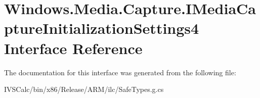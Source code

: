\hypertarget{interface_windows_1_1_media_1_1_capture_1_1_i_media_capture_initialization_settings4}{}\section{Windows.\+Media.\+Capture.\+I\+Media\+Capture\+Initialization\+Settings4 Interface Reference}
\label{interface_windows_1_1_media_1_1_capture_1_1_i_media_capture_initialization_settings4}


The documentation for this interface was generated from the following file\+:\begin{DoxyCompactItemize}
\item 
I\+V\+S\+Calc/bin/x86/\+Release/\+A\+R\+M/ilc/Safe\+Types.\+g.\+cs\end{DoxyCompactItemize}
